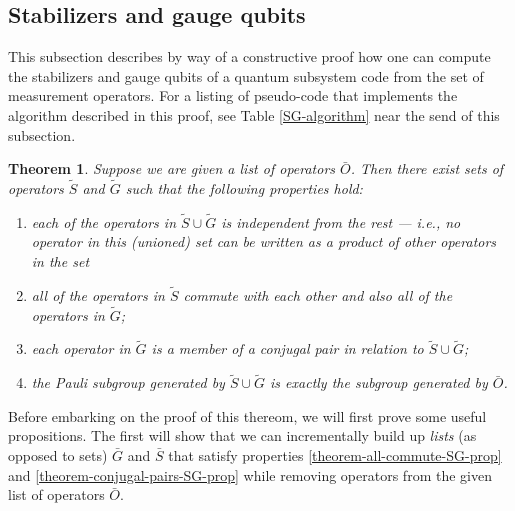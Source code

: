 \documentclass[twocolumn,showpacs,preprintnumbers,amsmath,amssymb,nofootinbib,pra,floatfix]{revtex4}
\newtheorem{theorem}{Theorem}
\newenvironment{remark}[1][Remark]{\begin{trivlist}
\item[\hskip \labelsep {\bfseries #1}]}{\end{trivlist}}
\newcommand{\lst}{\bar}
\newcommand{\set}{\tilde}
\begin{document}
\subsection{Stabilizers and gauge qubits}

\label{stabilizers-and-gauge-qubits}

\begin{remark}
This subsection describes by way of a constructive proof how one can
compute the stabilizers and gauge qubits of a quantum subsystem code
from the set of measurement operators.  For a listing of pseudo-code that
implements the algorithm described in this proof, see Table
\ref{SG-algorithm} near the send of this subsection.
\end{remark}
\begin{theorem} \label{theorem-SG} Suppose we are given a list of operators $\lst O$.  Then there exist sets of operators $\set S$ and $\set G$ such that the following properties hold:
\begin{enumerate}
\item each of the operators in $\set S \cup \set G$ is
  independent from the rest --- i.e., no operator in this (unioned) set can
  be written as a product of other operators in the set
\item \label{theorem-all-commute-SG-prop} all of the operators in $\set S$ commute with each other and
  also all of the operators in $\set G$;
\item \label{theorem-conjugal-pairs-SG-prop} each operator in $\set G$ is a member of a conjugal pair in relation to $\set S \cup \set G$;
\item \label{theorem-complete-SG-prop} the Pauli subgroup generated by $\set S \cup \set G$ is exactly
  the subgroup generated by $\lst O$.
\end{enumerate}
\end{theorem}
\begin{remark}
Before embarking on the proof of this thereom, we will first prove some useful propositions.  The first will show that we can incrementally build up \emph{lists} (as opposed to sets) $\lst G$ and $\lst S$ that satisfy properties \ref{theorem-all-commute-SG-prop} and \ref{theorem-conjugal-pairs-SG-prop} while removing operators from the given list of operators $\lst O$.
\end{remark}
\end{document}
